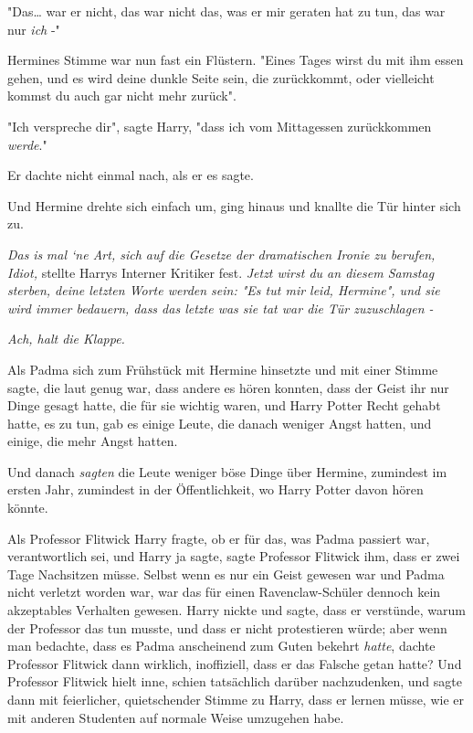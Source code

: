 {"Das… war er nicht, das war nicht das, was er mir geraten hat zu tun, das war nur \emph{ich} -"

Hermines Stimme war nun fast ein Flüstern. "Eines Tages wirst du mit ihm essen gehen, und es wird deine dunkle Seite sein, die zurückkommt, oder vielleicht kommst du auch gar nicht mehr zurück".

"Ich verspreche dir", sagte Harry, "dass ich vom Mittagessen zurückkommen \emph{werde}."

Er dachte nicht einmal nach, als er es sagte.

Und Hermine drehte sich einfach um, ging hinaus und knallte die Tür hinter sich zu.

\emph{Das} \emph{is} \emph{mal `ne Art, sich auf die Gesetze der dramatischen Ironie zu berufen, Idiot,} stellte Harrys Interner Kritiker fest. \emph{Jetzt wirst du an diesem Samstag sterben, deine letzten Worte werden sein: "Es tut mir leid, Hermine", und sie wird immer bedauern, dass das letzte was sie tat war die Tür zuzuschlagen -}

\emph{Ach, halt die Klappe.}

Als Padma sich zum Frühstück mit Hermine hinsetzte und mit einer Stimme sagte, die laut genug war, dass andere es hören konnten, dass der Geist ihr nur Dinge gesagt hatte, die für sie wichtig waren, und Harry Potter Recht gehabt hatte, es zu tun, gab es einige Leute, die danach weniger Angst hatten, und einige, die mehr Angst hatten.

Und danach \emph{sagten} die Leute weniger böse Dinge über Hermine, zumindest im ersten Jahr, zumindest in der Öffentlichkeit, wo Harry Potter davon hören könnte.

Als Professor Flitwick Harry fragte, ob er für das, was Padma passiert war, verantwortlich sei, und Harry ja sagte, sagte Professor Flitwick ihm, dass er zwei Tage Nachsitzen müsse. Selbst wenn es nur ein Geist gewesen war und Padma nicht verletzt worden war, war das für einen Ravenclaw-Schüler dennoch kein akzeptables Verhalten gewesen. Harry nickte und sagte, dass er verstünde, warum der Professor das tun musste, und dass er nicht protestieren würde; aber wenn man bedachte, dass es Padma anscheinend zum Guten bekehrt \emph{hatte}, dachte Professor Flitwick dann wirklich, inoffiziell, dass er das Falsche getan hatte? Und Professor Flitwick hielt inne, schien tatsächlich darüber nachzudenken, und sagte dann mit feierlicher, quietschender Stimme zu Harry, dass er lernen müsse, wie er mit anderen Studenten auf normale Weise umzugehen habe.

}
